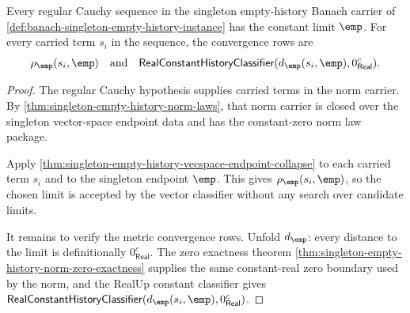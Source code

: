 \begin{theorem}
\label{thm:banach-singleton-empty-history-cauchy-completeness}
Every regular Cauchy sequence in the singleton empty-history Banach carrier of
\autoref{def:banach-singleton-empty-history-instance} has the constant limit
$\emp$. For every carried term $s_i$ in the sequence, the convergence rows are
$$
\rho_{\emp}(s_i,\emp)
\quad\text{and}\quad
\mathsf{RealConstantHistoryClassifier}(d_{\emp}(s_i,\emp),0_{\mathsf{Real}}^{c}).
$$
\end{theorem}
\begin{proof}
The regular Cauchy hypothesis supplies carried terms in the norm carrier. By
\autoref{thm:singleton-empty-history-norm-laws}, that norm carrier is closed
over the singleton vector-space endpoint data and has the constant-zero norm
law package.

Apply \autoref{thm:singleton-empty-history-vecspace-endpoint-collapse} to each
carried term $s_i$ and to the singleton endpoint $\emp$. This gives
$\rho_{\emp}(s_i,\emp)$, so the chosen limit is accepted by the vector
classifier without any search over candidate limits.

It remains to verify the metric convergence rows. Unfold $d_{\emp}$: every
distance to the limit is definitionally $0_{\mathsf{Real}}^{c}$. The zero
exactness theorem
\autoref{thm:singleton-empty-history-norm-zero-exactness} supplies the same
constant-real zero boundary used by the norm, and the RealUp constant
classifier gives
$\mathsf{RealConstantHistoryClassifier}(d_{\emp}(s_i,\emp),0_{\mathsf{Real}}^{c})$.
\end{proof}

